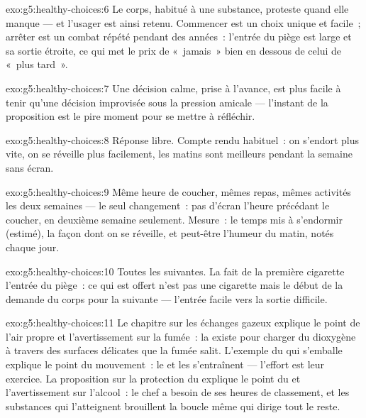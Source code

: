 \begin{solution}{exo:g5:healthy-choices:6}
Le corps, habitué à une substance, proteste quand elle manque --- et
l'usager est ainsi retenu. Commencer est un choix unique et facile~;
arrêter est un combat répété pendant des années~: l'entrée du piège
est large et sa sortie étroite, ce qui met le prix de «~jamais~»
bien en dessous de celui de «~plus tard~».
\end{solution}

\begin{solution}{exo:g5:healthy-choices:7}
Une décision calme, prise à l'avance, est plus facile à tenir qu'une
décision improvisée sous la pression amicale --- l'instant de la
proposition est le pire moment pour se mettre à réfléchir.
\end{solution}

\begin{solution}{exo:g5:healthy-choices:8}
Réponse libre. Compte rendu habituel~: on s'endort plus vite, on se
réveille plus facilement, les matins sont meilleurs pendant la
semaine sans écran.
\end{solution}

\begin{solution}{exo:g5:healthy-choices:9}
Même heure de coucher, mêmes repas, mêmes activités les deux
semaines --- le seul changement~: pas d'écran l'heure précédant le
coucher, en deuxième semaine seulement. Mesure~: le temps mis à
s'endormir (estimé), la façon dont on se réveille, et peut-être
l'humeur du matin, notés chaque jour.
\end{solution}

\begin{solution}{exo:g5:healthy-choices:10}
Toutes les suivantes. La  fait de la première cigarette
l'entrée du piège~: ce qui est offert n'est pas une cigarette mais
le début de la demande du corps pour la suivante --- l'entrée facile
vers la sortie difficile.
\end{solution}

\begin{solution}{exo:g5:healthy-choices:11}
Le chapitre sur les échanges gazeux explique le point de l'air
propre et l'avertissement sur la fumée~: la  existe pour
charger du dioxygène à travers des surfaces délicates que la fumée
salit. L'exemple du  qui s'emballe explique le point du
mouvement~: le  et les  s'entraînent --- l'effort est
leur exercice. La proposition sur la protection du  explique
le point du  et l'avertissement sur l'alcool~: le chef a
besoin de ses heures de classement, et les substances qui
l'atteignent brouillent la boucle même qui dirige tout le reste.
\end{solution}
